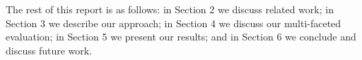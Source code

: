 The rest of this report is as follows: in Section 2 we discuss related
work; in Section 3 we describe our approach; in Section 4 we discuss
our multi-faceted evaluation; in Section 5 we present our results; and
in Section 6 we conclude and discuss future work.

%
%
%
%

%

